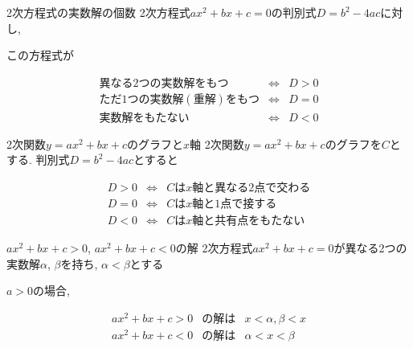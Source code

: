 \documentclass[aspectratio=169, 12pt]{beamer}
\begin{document}
\begin{frame}{2次方程式の実数解の個数}
    2次方程式$ax^2+bx+c=0$の判別式$D=b^2-4ac$に対し, \par
    この方程式が \par
    \begin{eqnarray*}
        異なる2つの実数解をもつ &\Leftrightarrow& D>0 \\
        ただ1つの実数解 (重解) をもつ &\Leftrightarrow& D=0 \\
        実数解をもたない &\Leftrightarrow& D<0
    \end{eqnarray*}
\end{frame}
\begin{frame}{2次関数$y=ax^2+bx+c$のグラフと$x$軸}
    2次関数$y=ax^2+bx+c$のグラフを$C$とする. 判別式$D=b^2-4ac$とすると \par
    \begin{eqnarray*}
        D>0&\Leftrightarrow& Cはx軸と異なる2点で交わる \\
        D=0&\Leftrightarrow& Cはx軸と1点で接する \\
        D<0&\Leftrightarrow& Cはx軸と共有点をもたない
    \end{eqnarray*}
\end{frame}
\begin{frame}{$ax^2+bx+c>0$, $ax^2+bx+c<0$の解}
    2次方程式$ax^2+bx+c=0$が異なる2つの実数解$\alpha$, $\beta$を持ち, $\alpha<\beta$とする \par
    $a>0$の場合, \par
    \begin{eqnarray*}
        ax^2+bx+c>0&の解は&x<\alpha, \beta<x \\
        ax^2+bx+c<0&の解は&\alpha<x<\beta
    \end{eqnarray*}
\end{frame}
\end{document}

